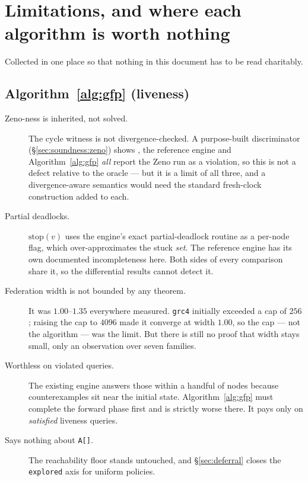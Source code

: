 \section{Limitations, and where each algorithm is worth nothing}
\label{sec:limits}

Collected in one place so that nothing in this document has to be read charitably.

\subsection{Algorithm~\ref{alg:gfp} (liveness)}

\begin{description}
  \item[Zeno-ness is inherited, not solved.] The cycle witness is not divergence-checked. A
        purpose-built discriminator (\S\ref{sec:soundness:zeno}) shows \verifyta{}, the reference
        engine and Algorithm~\ref{alg:gfp} \emph{all} report the Zeno run as a violation, so this is
        not a defect relative to the oracle --- but it is a limit of all three, and a
        divergence-aware semantics would need the standard fresh-clock construction added to each.
  \item[Partial deadlocks.] $\mathrm{stop}(v)$ uses the engine's exact partial-deadlock routine as a
        per-node flag, which over-approximates the stuck \emph{set}. The reference engine has its own
        documented incompleteness here. Both sides of every comparison share it, so the differential
        results cannot detect it.
  \item[Federation width is not bounded by any theorem.] It was $1.00$--$1.35$ everywhere measured.
        \texttt{grc4} initially exceeded a cap of $256$; raising the cap to $4096$ made it converge
        at width $1.00$, so the cap --- not the algorithm --- was the limit. But there is still no
        proof that width stays small, only an observation over seven families.
  \item[Worthless on violated queries.] The existing engine answers those within a handful of nodes
        because counterexamples sit near the initial state. Algorithm~\ref{alg:gfp} must complete
        the forward phase first and is strictly worse there. It pays only on \emph{satisfied}
        liveness queries.
  \item[Says nothing about \texttt{A[]}.] The reachability floor stands untouched, and
        \S\ref{sec:deferral} closes the \texttt{explored} axis for uniform policies.
\end{description}

